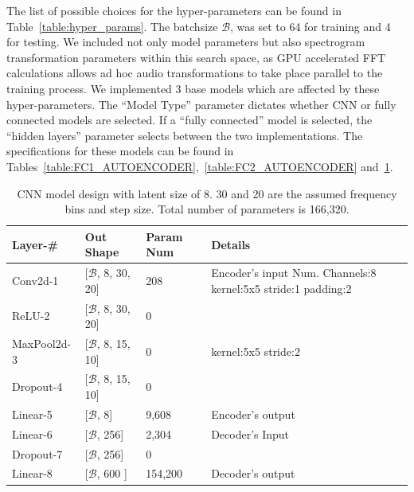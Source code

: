 \documentclass[\main/thesis.tex]{subfiles}
\begin{document}
The list of possible choices for the hyper-parameters can be found in Table~\ref{table:hyper_params}. The batchsize $\mathcal{B}$, was set to 64 for training and 4 for testing. We included not only model parameters but also spectrogram transformation parameters within this search space, as GPU accelerated FFT calculations allows ad hoc audio transformations to take place parallel to the training process. We implemented 3 base models which are affected by these hyper-parameters. The \enquote{Model Type} parameter dictates whether CNN or fully connected models are selected. If a \enquote{fully connected} model is selected, the \enquote{hidden layers} parameter selects between the two implementations. The specifications for these models can be found in Tables~\ref{table:FC1_AUTOENCODER},~\ref{table:FC2_AUTOENCODER} and~\ref{table:CNNAUTOENCODER}.

\begin{table}[]
\begin{tabular}{|p{28mm}|p{25mm}|p{23mm}|p{50mm}|}
\hline
Layer-\# & Out Shape & Param Num & Details  \\ \hline
Conv2d-1 & [$\mathcal{B}$, 8, 30, 20] &   208 & Encoder's input \newline
Num. Channels:8\newline
kernel:5x5\newline                  
stride:1\newline    
padding:2 \\ \hline
ReLU-2 & [$\mathcal{B}$, 8, 30, 20] &   0 & \\  \hline
MaxPool2d-3 & [$\mathcal{B}$, 8, 15, 10] & 0 &  kernel:5x5 \newline
stride:2 \\ \hline
Dropout-4 & [$\mathcal{B}$, 8, 15, 10] & 0 &  \\ \hline
Linear-5 & [$\mathcal{B}$, 8] & 9,608 & Encoder's output \\ \hline
Linear-6 & [$\mathcal{B}$, 256] & 2,304 & Decoder's Input \\ \hline
Dropout-7 & [$\mathcal{B}$, 256] & 0 &  \\ \hline
Linear-8 & [$\mathcal{B}$, 600 ] &  154,200& Decoder's output\\ \hline
\end{tabular}
\caption{CNN model design with latent size of 8. 30 and 20 are the assumed frequency bins and step size. Total number of parameters is 166,320. }
\label{table:CNNAUTOENCODER}
\end{table}
\end{document}
